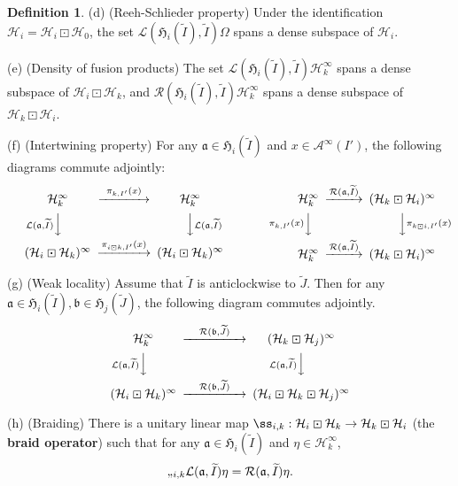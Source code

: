 \documentclass[12pt,a4paper]{article}
\theoremstyle{definition}
\newtheorem{df}{Definition}[subsection]
\theoremstyle{plain}
\newcommand{\fk}{\mathfrak}
\newcommand{\mc}{\mathcal}
\newcommand{\wtd}{\widetilde}
\numberwithin{equation}{subsection}
\begin{document}
\begin{df}
	(d) (Reeh-Schlieder property) Under the identification $\mc H_i=\mc H_i\boxdot\mc H_0$, the set $\mc L(\fk H_i(\wtd I),\wtd I)\Omega$ spans a dense subspace of $\mc H_i$.
	
	(e) (Density of fusion products) The set $\mc L(\fk H_i(\wtd I),\wtd I)\mc H_k^\infty$ spans a dense subspace of $\mc H_i\boxdot\mc H_k$, and $\mc R(\fk H_i(\wtd I),\wtd I)\mc H_k^\infty$ spans a dense subspace of $\mc H_k\boxdot\mc H_i$.
	
(f) (Intertwining property) 	For any $\fk a\in\fk H_i(\wtd I)$ and $x\in\mc A^\infty(I')$, the following diagrams commute adjointly:
\begin{gather}
\begin{CD}
\mc H_k^\infty @>~\pi_{k,I'}(x)~>> \mc H_k^\infty\\
@V \mc L(\fk a,\wtd I)  VV @VV \mc L(\fk a,\wtd I) V\\
(\mc H_i\boxdot\mc H_k)^\infty @> \pi_{i\boxdot k,I'}(x)>> (\mc H_i\boxdot\mc H_k)^\infty
\end{CD}\qquad\qquad\qquad
\begin{CD}
\mc H_k^\infty @> \mc R(\fk a,\wtd I)  >> (\mc H_k\boxdot\mc H_i)^\infty\\
@V \pi_{k,I'}(x) VV @VV \pi_{k\boxdot i,I'}(x) V\\
\mc H_k^\infty @>\mc R(\fk a,\wtd I) >> (\mc H_k\boxdot\mc H_i)^\infty
\end{CD}
\end{gather}
	
	

	(g) (Weak locality) Assume that $\wtd I$ is anticlockwise to $\wtd J$. Then for  any $\fk a\in\fk H_i(\wtd I),\fk b\in\fk H_j(\wtd J)$, the following diagram   commutes adjointly.
	\begin{align}
	\begin{CD}
	\mc H_k^\infty @> \quad \mc R(\fk b,\wtd J)\quad   >> (\mc H_k\boxdot\mc H_j)^\infty\\
	@V \mc L(\fk a,\wtd I)   V  V @V \mc L(\fk a,\wtd I) VV\\
	(\mc H_i\boxdot\mc H_k)^\infty @> \quad \mc R(\fk b,\wtd J) \quad  >> (\mc H_i\boxdot\mc H_k\boxdot\mc H_j)^\infty
	\end{CD}
	\end{align}
	
	(h) (Braiding) There is a unitary linear map $\ss_{i,k}:\mc H_i\boxdot\mc H_k\rightarrow\mc H_k\boxdot \mc H_i$ (the \textbf{braid operator}) such that for any  $\fk a\in\fk H_i(\wtd I)$ and $\eta\in\mc H_k^\infty$,
	\begin{align}
	\ss_{i,k} \mc L(\fk a,\wtd I)\eta=\mc R(\fk a,\wtd I)\eta.
	\end{align}
	

\end{df}
\end{document}
